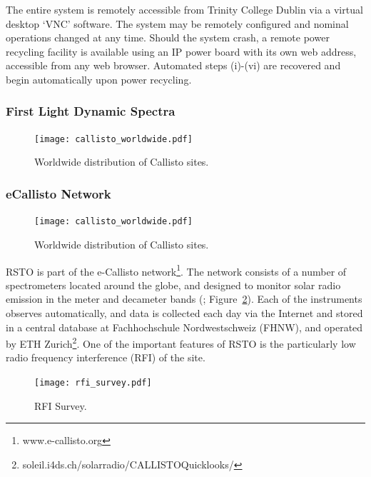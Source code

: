 The entire system is remotely accessible from Trinity College Dublin via a virtual desktop `VNC' software. The system may be remotely configured and nominal operations changed at any time. Should the system crash, a remote power recycling facility is available using an IP power board with its own web address, accessible from any web browser. Automated steps (i)-(vi) are recovered and begin automatically upon power recycling.

\subsubsection{First Light Dynamic Spectra}

\begin{figure}[!t]
\begin{center}
\texttt{[image: callisto\_worldwide.pdf]}
\caption[Callisto Worlwide]{Worldwide distribution of Callisto sites.}
\label{fig:callisto_worldwide}
\end{center}
\end{figure}


\subsubsection{eCallisto Network}
\begin{figure}[!t]
\begin{center}
\texttt{[image: callisto\_worldwide.pdf]}
\caption[Callisto Worlwide]{Worldwide distribution of Callisto sites.}
\label{fig:callisto_worldwide}
\end{center}
\end{figure}
RSTO is part of the e-Callisto network\footnote{www.e-callisto.org}. The network consists of a number of spectrometers located around the globe, and designed to monitor solar radio emission in the meter and decameter bands (\citealt{Benz2009}; Figure~\ref{fig:callisto_worldwide}).  Each of the instruments observes automatically, and data is collected each day via the Internet and stored in a central database at Fachhochschule Nordwestschweiz (FHNW), and operated by ETH Zurich\footnote{soleil.i4ds.ch/solarradio/CALLISTOQuicklooks/}. One of the important features of RSTO is the particularly low radio frequency interference (RFI) of the site. 
\begin{figure}[!t]
\begin{center}
\texttt{[image: rfi\_survey.pdf]}
\caption[RSTO RFI Survey]{RFI Survey.}
\label{fig:rfi_survey}
\end{center}
\end{figure}

